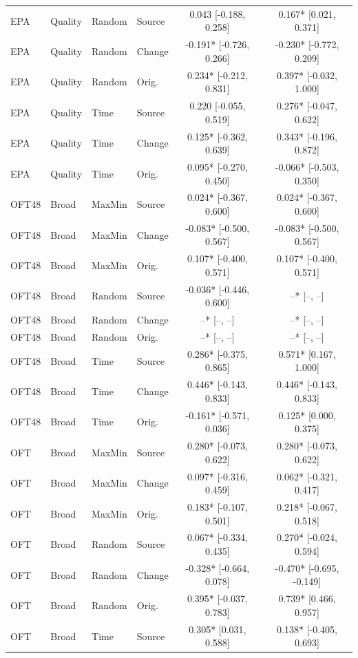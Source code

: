 \begin{longtable}{llllcc}
EPA & Quality & Random & Source & 0.043 [-0.188, 0.258] & 0.167* [0.021, 0.371] \\
EPA & Quality & Random & Change & -0.191* [-0.726, 0.266] & -0.230* [-0.772, 0.209] \\
EPA & Quality & Random & Orig. & 0.234* [-0.212, 0.831] & 0.397* [-0.032, 1.000] \\
EPA & Quality & Time & Source & 0.220 [-0.055, 0.519] & 0.276* [-0.047, 0.622] \\
EPA & Quality & Time & Change & 0.125* [-0.362, 0.639] & 0.343* [-0.196, 0.872] \\
EPA & Quality & Time & Orig. & 0.095* [-0.270, 0.450] & -0.066* [-0.503, 0.350] \\
OFT48 & Broad & MaxMin & Source & 0.024* [-0.367, 0.600] & 0.024* [-0.367, 0.600] \\
OFT48 & Broad & MaxMin & Change & -0.083* [-0.500, 0.567] & -0.083* [-0.500, 0.567] \\
OFT48 & Broad & MaxMin & Orig. & 0.107* [-0.400, 0.571] & 0.107* [-0.400, 0.571] \\
OFT48 & Broad & Random & Source & -0.036* [-0.446, 0.600] & --* [--, --] \\
OFT48 & Broad & Random & Change & --* [--, --] & --* [--, --] \\
OFT48 & Broad & Random & Orig. & --* [--, --] & --* [--, --] \\
OFT48 & Broad & Time & Source & 0.286* [-0.375, 0.865] & 0.571* [0.167, 1.000] \\
OFT48 & Broad & Time & Change & 0.446* [-0.143, 0.833] & 0.446* [-0.143, 0.833] \\
OFT48 & Broad & Time & Orig. & -0.161* [-0.571, 0.036] & 0.125* [0.000, 0.375] \\
OFT & Broad & MaxMin & Source & 0.280* [-0.073, 0.622] & 0.280* [-0.073, 0.622] \\
OFT & Broad & MaxMin & Change & 0.097* [-0.316, 0.459] & 0.062* [-0.321, 0.417] \\
OFT & Broad & MaxMin & Orig. & 0.183* [-0.107, 0.501] & 0.218* [-0.067, 0.518] \\
OFT & Broad & Random & Source & 0.067* [-0.334, 0.435] & 0.270* [-0.024, 0.594] \\
OFT & Broad & Random & Change & -0.328* [-0.664, 0.078] & -0.470* [-0.695, -0.149] \\
OFT & Broad & Random & Orig. & 0.395* [-0.037, 0.783] & 0.739* [0.466, 0.957] \\
OFT & Broad & Time & Source & 0.305* [0.031, 0.588] & 0.138* [-0.405, 0.693] \\

\end{longtable}
